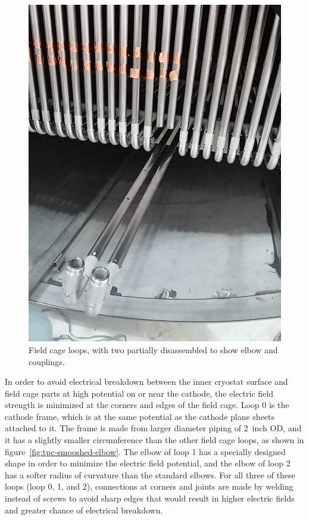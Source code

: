 \begin{figure}[htb]
\centering	
\includegraphics[width=0.8\linewidth]{figures/tpc-fieldcage-elbows.jpg}
\caption{Field cage loops, with two partially disassembled to show elbow and couplings.}
\label{fig:tpc-fieldcage-elbows}
\end{figure}

In order to avoid electrical breakdown between the inner cryostat surface and field cage parts at high potential on or near the cathode, the electric field strength is minimized at the corners and edges of the field cage. Loop 0 is the cathode frame, which is at the same potential as the cathode plane sheets attached to it. The frame is made from larger diameter piping of 2~inch OD, and it has a slightly smaller circumference than the other field cage loops, as shown in figure~\ref{fig:tpc-smooshed-elbow}. The elbow of loop 1 has a specially designed shape in order to minimize the electric field potential, and the elbow of loop 2 has a softer radius of curvature than the standard elbows. For all three of these loops (loop 0, 1, and 2), connections at corners and joints are made by welding instead of screws to avoid sharp edges that would result in higher electric fields and greater chance of electrical breakdown.

